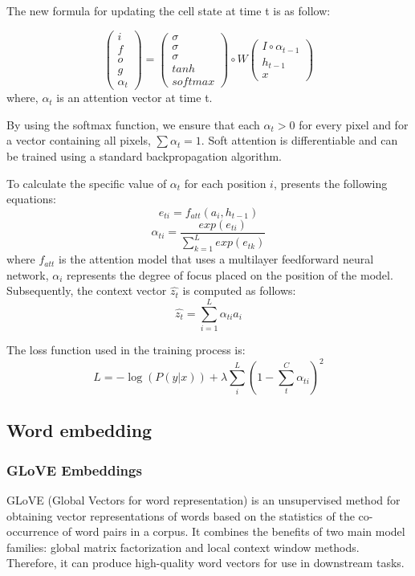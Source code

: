 \documentclass[conference]{IEEEtran}
\begin{document}
The new formula for updating the cell state at time t is as follow:

$$
\begin{pmatrix}
i \\f \\o \\g \\\alpha_t
\end{pmatrix}
= 
\begin{pmatrix}
\sigma \\ \sigma \\ \sigma \\ tanh \\ softmax
\end{pmatrix}
\circ
W
\begin{pmatrix}
I \circ \alpha_{t-1} \\ h_{t-1} \\ x
\end{pmatrix}
$$
where, $\alpha_t$ is an attention vector at time t.

By using the softmax function, we ensure that each $\alpha_t>0$ for every pixel and for a vector containing all pixels, $\sum{}{}\alpha_t=1$. Soft attention is differentiable and can be trained using a standard backpropagation algorithm.


To calculate the specific value of $\alpha_t$ for each position $i$, \cite{xu2015show} presents the following equations:
$$e_{ti}=f_{att}(a_{i},h_{t-1})$$
$$\alpha_{ti}=\frac{exp(e_{ti})}{\sum_{k=1}^{L} exp(e_{tk})}$$
where $f_{att}$ is the attention model that uses a multilayer feedforward neural network, $\alpha_{i}$ represents the degree of focus placed on the position of the model. Subsequently, the context vector $\hat{z_{t}}$ is computed as follows:
$$\hat{z_{t}}=\sum_{i=1}^{L} \alpha_{ti}a_{i}$$


The loss function used in the training process is:
$$L=-\log (P(y|x)) + \lambda \sum_{i}^{L} (1-\sum_{t}^{C} \alpha_{ti})^2$$


\subsection{Word embedding\label{embedding}}
\subsubsection{GLoVE Embeddings}
GLoVE (Global Vectors for word representation)\cite{pennington2014glove} is an unsupervised method for obtaining vector representations of words based on the statistics of the co-occurrence of word pairs in a corpus. It combines the benefits of two main model families: global matrix factorization and local context window methods. Therefore, it can produce high-quality word vectors for use in downstream tasks. 
\end{document}
